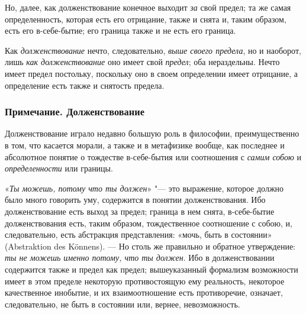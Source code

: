 Но, далее, как долженствование конечное выходит {\em за}
свой предел; та же самая определенность, которая есть его отрицание, также
и снята и, таким образом, есть его в-себе-бытие; его граница также и не
есть его граница.

Как {\em долженствование} нечто, следовательно,
{\em выше своего предела}, но и наоборот, лишь
{\em как долженствование} оно имеет свой
{\em предел}; оба нераздельны. Нечто имеет предел
постольку, поскольку оно в своем определении имеет отрицание, а определение
есть также и снятость предела.

\subsubsection[Примечание. Долженствование]{Примечание. Долженствование}

Долженствование играло недавно большую роль в философии, преимущественно в
том, что касается морали, а также и в метафизике вообще, как последнее и
абсолютное понятие о тождестве в-себе-бытия или соотношения с
{\em самим собою} и
{\em определенности} или границы.

«{\em Ты можешь, потому что ты
должен}» "--- это выражение, которое должно
было много говорить уму, содержится в понятии долженствования. Ибо
долженствование есть выход за предел; граница в нем снята, в-себе-бытие
долженствования есть, таким образом, тождественное соотношение с собою, и,
следовательно, есть абстракция представления: «мочь, быть в состоянии»
(Abstraktion des Könnens). — Но столь же правильно и обратное утверждение:
{\em ты не можешь именно потому, что ты должен}. Ибо в
долженствовании содержится также и предел как предел; вышеуказанный
формализм возможности имеет в этом пределе некоторую противостоящую ему
реальность, некоторое качественное инобытие, и их взаимоотношение есть
противоречие, означает, следовательно, не быть в состоянии или, вернее,
невозможность.


